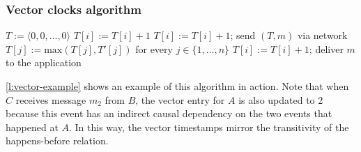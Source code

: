 \begin{frame}
    \label{s:vector-definition}
    \frametitle{Vector clocks algorithm}
    \begin{algorithmic}
            \State $T := \langle 0, 0, \dots, 0 \rangle$ 
        \EndOn
        \State
            \State $T[i] := T[i] + 1$
        \EndOn
        \State
            \State $T[i] := T[i] + 1$; send $(T, m)$ via network
        \EndOn
        \State
            \State $T[j] := \mathrm{max}(T[j], T'[j])$ for every $j \in \{1, \dots, n\}$
            \State $T[i] := T[i] + 1$; deliver $m$ to the application
        \EndOn
    \end{algorithmic}
\end{frame}
\label{l:vector-definition}

\autoref{l:vector-example} shows an example of this algorithm in action.
Note that when $C$ receives message $m_2$ from $B$, the vector entry for $A$ is also updated to 2 because this event has an indirect causal dependency on the two events that happened at $A$.
In this way, the vector timestamps mirror the transitivity of the happens-before relation.

